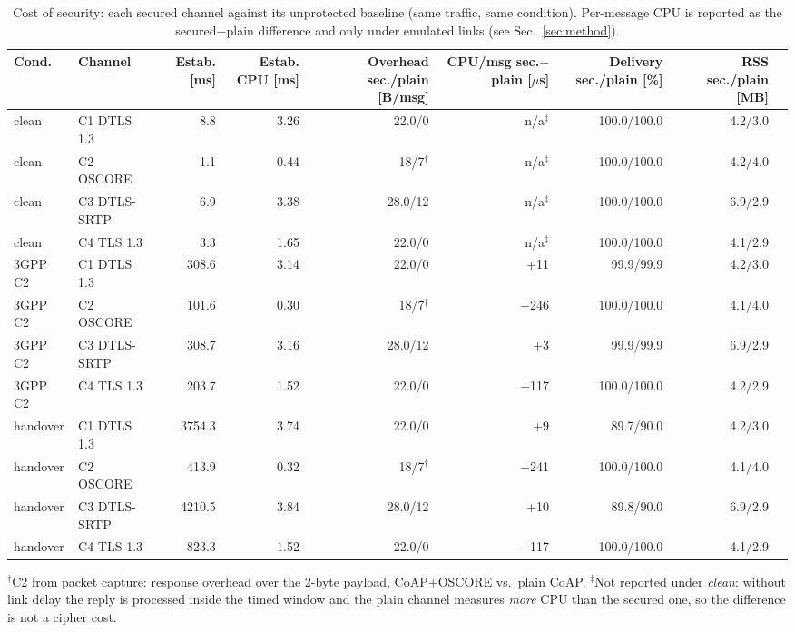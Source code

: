 \begin{table}[t]
\centering
\caption{Cost of security: each secured channel against its unprotected baseline (same traffic, same condition). Per-message CPU is reported as the secured$-$plain difference and only under emulated links (see Sec.~\ref{sec:method}).}
\label{tab:cost}
\begin{tabular}{llrrrrrrr}
\toprule
Cond. & Channel & Estab. [ms] & Estab. CPU [ms] & Overhead sec./plain [B/msg] & CPU/msg sec.$-$plain [$\mu$s] & Delivery sec./plain [\%] & RSS sec./plain [MB] \\
\midrule
clean & C1 DTLS 1.3 & 8.8 & 3.26 & 22.0/0 & n/a$^{\ddagger}$ & 100.0/100.0 & 4.2/3.0 \\
clean & C2 OSCORE & 1.1 & 0.44 & 18/7$^{\dagger}$ & n/a$^{\ddagger}$ & 100.0/100.0 & 4.2/4.0 \\
clean & C3 DTLS-SRTP & 6.9 & 3.38 & 28.0/12 & n/a$^{\ddagger}$ & 100.0/100.0 & 6.9/2.9 \\
clean & C4 TLS 1.3 & 3.3 & 1.65 & 22.0/0 & n/a$^{\ddagger}$ & 100.0/100.0 & 4.1/2.9 \\
\midrule
3GPP C2 & C1 DTLS 1.3 & 308.6 & 3.14 & 22.0/0 & +11 & 99.9/99.9 & 4.2/3.0 \\
3GPP C2 & C2 OSCORE & 101.6 & 0.30 & 18/7$^{\dagger}$ & +246 & 100.0/100.0 & 4.1/4.0 \\
3GPP C2 & C3 DTLS-SRTP & 308.7 & 3.16 & 28.0/12 & +3 & 99.9/99.9 & 6.9/2.9 \\
3GPP C2 & C4 TLS 1.3 & 203.7 & 1.52 & 22.0/0 & +117 & 100.0/100.0 & 4.2/2.9 \\
\midrule
handover & C1 DTLS 1.3 & 3754.3 & 3.74 & 22.0/0 & +9 & 89.7/90.0 & 4.2/3.0 \\
handover & C2 OSCORE & 413.9 & 0.32 & 18/7$^{\dagger}$ & +241 & 100.0/100.0 & 4.1/4.0 \\
handover & C3 DTLS-SRTP & 4210.5 & 3.84 & 28.0/12 & +10 & 89.8/90.0 & 6.9/2.9 \\
handover & C4 TLS 1.3 & 823.3 & 1.52 & 22.0/0 & +117 & 100.0/100.0 & 4.1/2.9 \\
\bottomrule
\end{tabular}
\begin{flushleft}\footnotesize
$^{\dagger}$C2 from packet capture: response overhead over the 2-byte payload, CoAP+OSCORE vs.\ plain CoAP. $^{\ddagger}$Not reported under \emph{clean}: without link delay the reply is processed inside the timed window and the plain channel measures \emph{more} CPU than the secured one, so the difference is not a cipher cost.
\end{flushleft}
\end{table}
